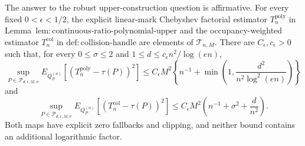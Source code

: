 The answer to the robust upper-construction question is affirmative.  For every fixed \(0<\epsilon<1/2\), the explicit linear-mark Chebyshev factorial estimator \(T_n^{\mathrm{poly}}\) in Lemma~\(\mathrm{lem:continuous\text{-}ratio\text{-}polynomial\text{-}upper}\) and the occupancy-weighted estimator \(T_n^{\mathrm{col}}\) in \(\mathrm{def:collision\text{-}handle}\) are elements of \(\mathcal T_{n,M}\).  There are \(C_{\epsilon},c_{\epsilon}>0\) such that, for every \(0\le\sigma\le2\) and \(1\le d\le c_{\epsilon}n^2/\log(en)\),
\[
 \sup_{P\in\mathcal P_{d,\epsilon,M,\sigma}}
 E_{Q_P^{(n)}}[(T_n^{\mathrm{poly}}-\tau(P))^2]
 \le C_{\epsilon}M^2\left\{n^{-1}+\min\left(1,\frac{d^2}{n^2\log^2(en)}\right)\right\}
\]
and
\[
 \sup_{P\in\mathcal P_{d,\epsilon,M,\sigma}}
 E_{Q_P^{(n)}}[(T_n^{\mathrm{col}}-\tau(P))^2]
 \le C_{\epsilon}M^2\left(n^{-1}+\sigma^2+\frac d{n^2}\right).
\]
Both maps have explicit zero fallbacks and clipping, and neither bound contains an additional logarithmic factor.